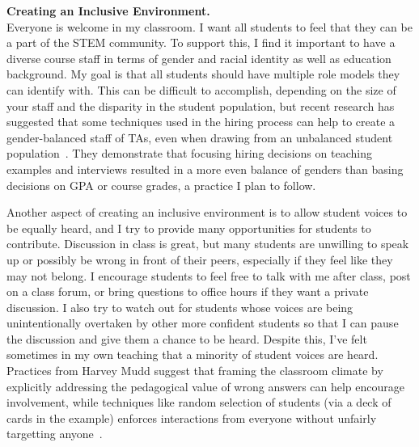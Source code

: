 \documentclass[11pt]{article} %
\begin{document}
\bigskip
\textbf{\textsf{\large Creating an Inclusive Environment.}}\\
Everyone is welcome in my classroom. I want all students to feel that they can
be a part of the STEM community.
%
To support this, I find it important to have a diverse course staff in terms
of gender and racial identity as well as education background. My goal is
that all students should have multiple role models they can identify with.
%
This can be difficult to accomplish, depending on the size of your staff and the
disparity in the student population, but recent research has suggested that
some techniques used in the hiring process can help to create a gender-balanced
staff of TAs, even when drawing from an unbalanced student
population~\footnotemark{}. They demonstrate that focusing hiring decisions on
teaching examples and interviews resulted in a more even balance of genders
than basing decisions on GPA or course grades, a practice I plan to follow.


Another aspect of creating an inclusive environment is to allow student voices
to be equally heard, and I try to provide many opportunities for students to
contribute.
%
Discussion in class is great, but many students are unwilling to speak up or
possibly be wrong in front of their peers, especially if they feel like they
may not belong.
%
I encourage students to feel free to talk with me after class, post on a class
forum, or bring questions to office hours if they want a private discussion. I
also try to watch out for students whose voices are being unintentionally
overtaken by other more confident students so that I can pause the discussion
and give them a chance to be heard.
%
Despite this, I've felt sometimes in my own teaching that a minority of student
voices are heard. Practices from Harvey Mudd suggest that framing the
classroom climate by explicitly addressing the pedagogical value of wrong
answers can help encourage involvement, while techniques like random selection
of students (via a deck of cards in the example) enforces interactions from
everyone without unfairly targetting anyone~\footnotemark{}.
%

\end{document}
